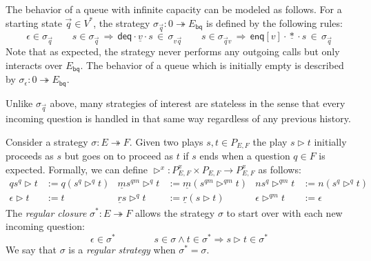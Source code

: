 \documentclass[acmsmall,screen,review,nonacm]{acmart}
\newcommand{\kw}[1]{\ensuremath{ \mathsf{#1} }}
\newcommand{\emptysig}{0}
\begin{document}
\begin{example} %
The behavior of a queue with infinite capacity
can be modeled as follows.
For a starting state $\vec{q} \in V^*$,
the strategy $\sigma_{\vec{q}} : \emptysig \twoheadrightarrow E_\kw{bq}$
is defined by the following rules:
\[
  \epsilon \in \sigma_{\vec{q}}
  \qquad
  s \in \sigma_{\vec{q}} \,\Rightarrow\,
  \kw{deq} \cdot \underline{v} \cdot s \, \in \, \sigma_{v \vec{q}}
  \qquad
  s \in \sigma_{\vec{q} v} \,\Rightarrow\,
  \kw{enq}[v] \cdot \underline{*} \cdot s \, \in \, \sigma_{\vec{q}}
\]
Note that as expected, the strategy never performs any outgoing calls
but only interacts over $E_\kw{bq}$.
The behavior of a queue which is initially empty
is described by $\sigma_\epsilon : \emptysig \twoheadrightarrow E_\kw{bq}$.
\end{example}


Unlike $\sigma_{\vec{q}}$ above,
many strategies of interest are stateless
in the sense that every incoming question
is handled in that same way
regardless of any previous history.

\begin{definition}
Consider a strategy $\sigma : E \twoheadrightarrow F$.
Given two plays $s, t \in P_{E,F}$
the play $s \rhd t$ initially proceeds as $s$
but goes on to proceed as $t$ if $s$ ends
when a question $q \in F$ is expected.
Formally,
we can define
$\rhd^x : P_{E,F}^x \times P_{E,F} \rightarrow P_{E,F}^x$
as follows:
\begin{align*}
  qs^q \rhd t &:= q ( s^q \rhd^q t ) &
  \underline{m} s^{qm} \rhd^q t &:= \underline{m} (s^{qm} \rhd^{qm} t) &
  n s^q \rhd^{qm} t &:= n (s^q \rhd^q t) \\
  \epsilon \rhd t &:= t &
  \underline{r} s \rhd^q t &:= \underline{r} (s \rhd t) &
  \epsilon \rhd^{qm} t &:= \epsilon
\end{align*}
The \emph{regular closure} $\sigma^* : E \twoheadrightarrow F$
allows the strategy $\sigma$
to start over with each new incoming question:
\[
  \epsilon \in \sigma^*
  \qquad \qquad
  s \in \sigma \wedge t \in \sigma^* \Rightarrow
  s \rhd t \in \sigma^*
\]
We say that $\sigma$ is a \emph{regular strategy}
when $\sigma^* = \sigma$.
\end{definition}
\end{document}
